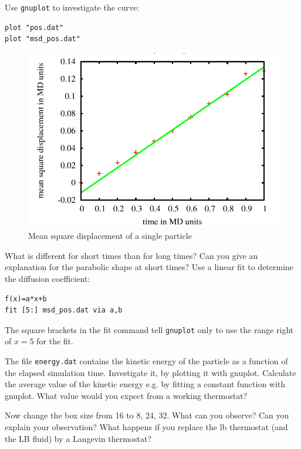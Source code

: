 Use  \lstinline|gnuplot|
to investigate the curve:
{\vspace{0,2cm}\small
\begin{lstlisting}[numbers=none]
plot "pos.dat"
plot "msd_pos.dat"
\end{lstlisting}\vspace{0,2cm}
}
\begin{figure}[h]
  \begin{center}
    \includegraphics{../figs/msd.pdf}
  \end{center}
  \caption{Mean square displacement of a single particle}
\end{figure}

What is different for short times than for long times?
Can you give an explanation for the parabolic shape at short
times?
Use a linear fit to determine the diffusion coefficient:
{\vspace{0,2cm}\small
\begin{lstlisting}[numbers=none]
f(x)=a*x+b
fit [5:] msd_pos.dat via a,b
\end{lstlisting}\vspace{0,2cm}
}
The square brackets in the fit command tell \lstinline{gnuplot}
only to use the range right of $x=5$ for the fit.

The file \lstinline|energy.dat| contains the kinetic energy of the
particle as a function of the elapsed simulation time. Investigate
it, by plotting it with gnuplot. Calculate the average value of 
the kinetic energy e.g. by fitting a constant function with gnuplot.
What value would you expect from a working thermostat?

Now change the box size from 16 to 8, 24, 32. What can you observe?
Can you explain your observation?
What happens if you replace the lb thermostat (and the LB fluid)
by a Langevin thermostat?

